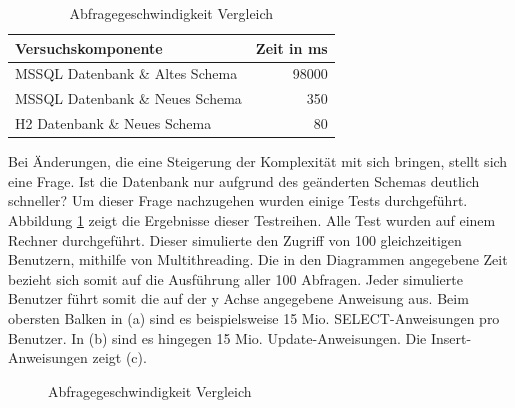 \begin{table}[htbp]
\centering
\begin{tabular} {l | r}
Versuchskomponente & Zeit in ms  \\ \hline
MSSQL Datenbank \& Altes Schema & 98000 \\
MSSQL Datenbank \& Neues Schema & 350 \\
H2 Datenbank \& Neues Schema & 80 \\
\end{tabular}
\caption{Abfragegeschwindigkeit Vergleich}
\label{tb:vergleichAbfragegeschwindigkeit}
\end{table}

Bei Änderungen, die eine Steigerung der Komplexität mit sich bringen, stellt sich eine Frage. Ist die Datenbank nur aufgrund des geänderten Schemas deutlich schneller? Um dieser Frage nachzugehen wurden einige Tests durchgeführt. Abbildung \ref{ergebniss_vergleich} zeigt die Ergebnisse dieser Testreihen. Alle Test wurden auf einem Rechner durchgeführt. Dieser simulierte den Zugriff von 100 gleichzeitigen Benutzern, mithilfe von Multithreading. Die in den Diagrammen angegebene Zeit bezieht sich somit auf die Ausführung aller 100 Abfragen. Jeder simulierte Benutzer führt somit die auf der y Achse angegebene Anweisung aus. Beim obersten Balken in (a) sind es beispielsweise 15 Mio. SELECT-Anweisungen pro Benutzer. In (b) sind es hingegen 15 Mio. Update-Anweisungen. Die Insert-Anweisungen zeigt (c).    

\begin{figure}[htbp]
\centering
{}\hfill
{}\hfill
{}
\caption{Abfragegeschwindigkeit Vergleich}
\label{ergebniss_vergleich}
\end{figure}

